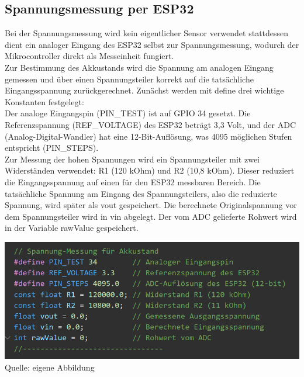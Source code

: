 \documentclass[ngerman,12pt,a4paper]{article}
\begin{document}
	 \subsection{Spannungsmessung per ESP32}
	 Bei der Spannungsmessung wird kein eigentlicher Sensor verwendet stattdessen dient ein analoger Eingang des ESP32 selbst zur Spannungsmessung, wodurch der Mikrocontroller direkt als Messeinheit fungiert.\\[0.5cm]
	 Zur Bestimmung des Akkustands wird die Spannung am analogen Eingang gemessen und über einen Spannungsteiler korrekt auf die tatsächliche Eingangsspannung zurückgerechnet.
	 Zunächst werden mit define drei wichtige Konstanten festgelegt: \\[0.3cm]
	 Der analoge Eingangspin (PIN\_TEST) ist auf GPIO 34 gesetzt. Die Referenzspannung (REF\_VOLTAGE) des ESP32 beträgt 3,3 Volt, und der ADC (Analog-Digital-Wandler) hat eine 12-Bit-Auflösung, was 4095 möglichen Stufen entspricht (PIN\_STEPS).\\[1cm]
	 Zur Messung der hohen Spannungen wird ein Spannungsteiler mit zwei Widerständen verwendet: R1 (120 kOhm) und R2 (10,8 kOhm). Dieser reduziert die Eingangsspannung auf einen für den ESP32 messbaren Bereich. Die tatsächliche Spannung am Eingang des Spannungsteilers, also die reduzierte Spannung, wird später als vout gespeichert. Die berechnete Originalspannung vor dem Spannungsteiler wird in vin abgelegt. Der vom ADC gelieferte Rohwert wird in der Variable rawValue gespeichert.
	 \begin{center}
	 	\begin{minipage}{1\textwidth}
	 		\centering
	 		\includegraphics[width=\textwidth]{Pictures/code_spannungsmessung_dek}
	 		\label{fig:code_spannungsmessung_dek}
	 		\vspace{-3pt}
	 		{\small Quelle: {eigene Abbildung}}
	 	\end{minipage}
	 \end{center}
	 
\end{document}
